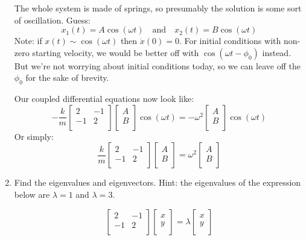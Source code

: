 \documentclass[12pt]{article}
\newcommand{\purple}[1]{{\color{purple} #1}}
\begin{document}
\begin{enumerate}
\purple{
The whole system is made of springs, so presumably the solution is some sort of oscillation. Guess:
$$
x_1(t) = A\cos \left( \omega t \right)
\quad\text{and}\quad
x_2(t) = B\cos \left( \omega t \right)
$$
Note: if $x(t) \sim \cos \left( \omega t \right)$ then $\dot{x}(0) = 0$. For initial conditions with non-zero starting velocity, we would be better off with $\cos\left( \omega t - \phi_0 \right)$ instead. But we're not worrying about initial conditions today, so we can leave off the $\phi_0$ for the sake of brevity.

Our coupled differential equations now look like:
$$
-\frac{k}{m}
\left[
{\begin{array}{cc}
   2 & -1\\
   -1 & 2\\
  \end{array} }
\right]
\left[
{\begin{array}{c}
   A\\
   B\\
  \end{array} }
\right]
\cos \left( \omega t \right)
= 
- \omega^2
\left[
{\begin{array}{c}
   A\\
   B\\
  \end{array} }
\right]
\cos \left( \omega t \right)
$$
Or simply:
$$
\frac{k}{m}
\left[
{\begin{array}{cc}
   2 & -1\\
   -1 & 2\\
  \end{array} }
\right]
\left[
{\begin{array}{c}
   A\\
   B\\
  \end{array} }
\right]
= 
\omega^2
\left[
{\begin{array}{c}
   A\\
   B\\
  \end{array} }
\right]
$$
}
\item Find the eigenvalues and eigenvectors. Hint: the eigenvalues of the expression below
are $\lambda=1$ and $\lambda = 3$.

$$
\left[
{\begin{array}{cc}
   2 & -1\\
   -1 & 2\\
  \end{array} }
\right]
\left[
{\begin{array}{c}
   x\\
   y\\
  \end{array} }
\right]
 = 
 \lambda\left[
{\begin{array}{c}
   x\\
   y\\
  \end{array} }
\right]
$$


\end{enumerate}
\end{document}
